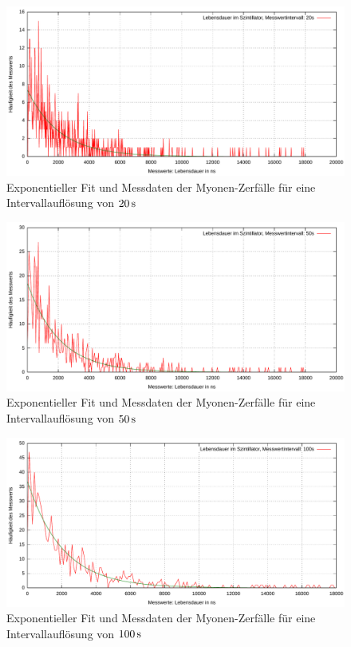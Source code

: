\documentclass[numbers=noenddot,12pt,a4paper]{scrartcl}
\begin{document}
\begin{figure}[H]
	\centering
	\includegraphics[width=\textwidth]{messwerte/lifetime20s.pdf}
	\caption{Exponentieller Fit und Messdaten der Myonen-Zerfälle für eine Intervallauflösung von $\unit[20]{s}$}\label{img:zerfall20s}
\end{figure}
\begin{figure}[H]
	\centering
	\includegraphics[width=\textwidth]{messwerte/lifetime50s.pdf}
	\caption{Exponentieller Fit und Messdaten der Myonen-Zerfälle für eine Intervallauflösung von $\unit[50]{s}$}\label{img:zerfall50s}
\end{figure}
\begin{figure}[H]
	\centering
	\includegraphics[width=\textwidth]{messwerte/lifetime100s.pdf}
	\caption{Exponentieller Fit und Messdaten der Myonen-Zerfälle für eine Intervallauflösung von $\unit[100]{s}$}\label{img:zerfall100s}
\end{figure}
\end{document}
